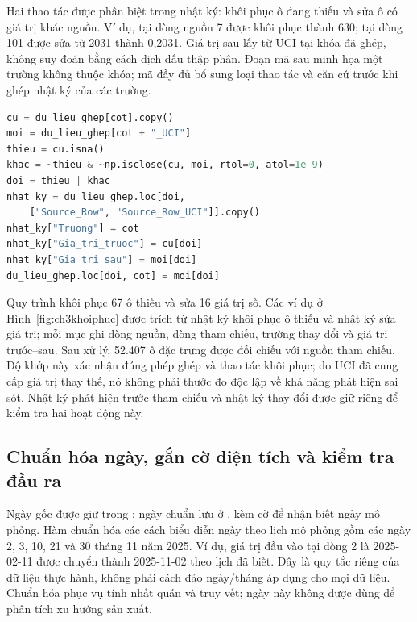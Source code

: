 Hai thao tác được phân biệt trong nhật ký: khôi phục ô đang thiếu và sửa ô có giá trị khác nguồn. Ví dụ,  tại dòng nguồn 7 được khôi phục thành 630;  tại dòng 101 được sửa từ 2031 thành 0,2031. Giá trị sau lấy từ UCI tại khóa đã ghép, không suy đoán bằng cách dịch dấu thập phân. Đoạn mã sau minh họa một trường  không thuộc khóa; mã đầy đủ bổ sung loại thao tác và căn cứ trước khi ghép nhật ký của các trường.

\noindent\begin{minipage}{\linewidth}
\begin{lstlisting}[language=Python]
cu = du_lieu_ghep[cot].copy()
moi = du_lieu_ghep[cot + "_UCI"]
thieu = cu.isna()
khac = ~thieu & ~np.isclose(cu, moi, rtol=0, atol=1e-9)
doi = thieu | khac
nhat_ky = du_lieu_ghep.loc[doi,
    ["Source_Row", "Source_Row_UCI"]].copy()
nhat_ky["Truong"] = cot
nhat_ky["Gia_tri_truoc"] = cu[doi]
nhat_ky["Gia_tri_sau"] = moi[doi]
du_lieu_ghep.loc[doi, cot] = moi[doi]
\end{lstlisting}
\end{minipage}\par

Quy trình khôi phục 67 ô thiếu và sửa 16 giá trị số. Các ví dụ ở Hình~\ref{fig:ch3khoiphuc} được trích từ nhật ký khôi phục ô thiếu và nhật ký sửa giá trị; mỗi mục ghi dòng nguồn, dòng tham chiếu, trường thay đổi và giá trị trước--sau. Sau xử lý, 52.407 ô đặc trưng được đối chiếu với nguồn tham chiếu. Độ khớp này xác nhận đúng phép ghép và thao tác khôi phục; do UCI đã cung cấp giá trị thay thế, nó không phải thước đo độc lập về khả năng phát hiện sai sót. Nhật ký phát hiện trước tham chiếu và nhật ký thay đổi được giữ riêng để kiểm tra hai hoạt động này.

\subsection{Chuẩn hóa ngày, gắn cờ diện tích và kiểm tra đầu ra}

Ngày gốc được giữ trong ; ngày chuẩn lưu ở , kèm cờ  để nhận biết ngày mô phỏng. Hàm  chuẩn hóa các cách biểu diễn ngày theo lịch mô phỏng gồm các ngày 2, 3, 10, 21 và 30 tháng 11 năm 2025. Ví dụ, giá trị đầu vào tại dòng 2 là 2025-02-11 được chuyển thành 2025-11-02 theo lịch đã biết. Đây là quy tắc riêng của dữ liệu thực hành, không phải cách đảo ngày/tháng áp dụng cho mọi dữ liệu. Chuẩn hóa phục vụ tính nhất quán và truy vết; ngày này không được dùng để phân tích xu hướng sản xuất.

